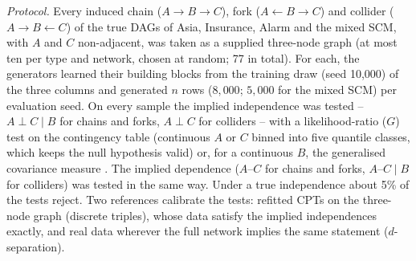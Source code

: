 \documentclass[
  english,
  class=report,
  accentcolor=2c,
  marginpar=false,
  parskip=half-,
  fontsize=11pt,
  ruledheaders=false,
  pdfa=false,
  IMRAD=false,
  thesis={type=master}
]{tudapub}
\begin{document}
\emph{Protocol.} Every induced chain ($A \to B \to C$), fork
($A \leftarrow B \to C$) and collider ($A \to B \leftarrow C$) of the true
DAGs of Asia, Insurance, Alarm and the mixed SCM, with $A$ and $C$
non-adjacent, was taken as a supplied three-node graph (at most ten per
type and network, chosen at random; 77 in total). For each, the generators
learned their building blocks from the training draw (seed 10{,}000) of the
three columns and generated $n$ rows ($8{,}000$; $5{,}000$ for the mixed SCM)
per evaluation seed. On every sample the implied independence was tested --
$A \perp C \mid B$ for chains and forks, $A \perp C$ for colliders -- with a
likelihood-ratio ($G$) test on the contingency table (continuous $A$ or $C$
binned into five quantile classes, which keeps the null hypothesis valid)
or, for a continuous $B$, the generalised covariance measure
\parencite{shah2020}. The implied dependence ($A$--$C$ for chains and forks,
$A$--$C \mid B$ for colliders) was tested in the same way. Under a true
independence about 5\% of the tests reject. Two references calibrate the
tests: refitted CPTs on the three-node graph (discrete triples), whose data
satisfy the implied independences exactly, and real data wherever the full
network implies the same statement ($d$-separation).
\end{document}

